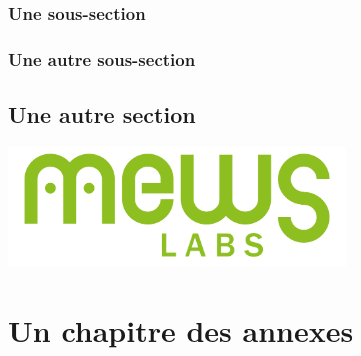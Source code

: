 \documentclass[a4paper, french, 10pt, twoside, openright]{report}
\begin{document}
\subsection{Une sous-section}

\lipsum[1]

\subsection{Une autre sous-section}

\lipsum[3]




\section{Une autre section}

\lipsum[4-6]

\begin{mfig}
  \includegraphics[width=0.67\textwidth]{mewslabs.png}
\end{mfig}



\mappendix
\chapter{Un chapitre des annexes}

\lipsum


\end{document}
